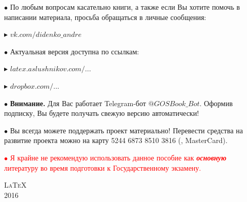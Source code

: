 \begin{flushleft}
$\bullet$ По любым вопросам касательно книги, а также если Вы хотите помочь в написании материала, просьба обращаться в личные сообщения: 

\vspace*{0.2\baselineskip}

\qquad\textcolor{Purplemountainmajesty}{$\blacktriangleright$ }\href{https://vk.com/didenko_andre}{$vk.com/didenko\_andre$}

\vfill

$\bullet$ Актуальная версия доступна по ссылкам:

\vspace*{0.2\baselineskip}

\qquad\textcolor{Purplemountainmajesty}{$\blacktriangleright$ }\href{http://latex.aslushnikov.com/compile?git=https://github.com/DidenkoAndre/GOS_book&target=_main.tex}{\large \textcolor{Purplemountainmajesty}{$latex.aslushnikov.com/...$}}

\vspace*{0.2\baselineskip}

\qquad\textcolor{Purplemountainmajesty}{$\blacktriangleright$ }\href{https://www.dropbox.com/sh/7e5mfj8q68o2ipp/AAD8XvpZhiJzFbEh_IeH305ia?dl=0&preview=GOSBook.pdf}{\large \textcolor{Purplemountainmajesty}{$dropbox.com/...$}}

\vfill

$\bullet$ \textbf{Внимание.} Для Вас работает Telegram-бот \href{https://t.me/GOSBook_Bot}{\textcolor{PersianBlue}{$@GOSBook\_Bot$}}. Оформив подписку\footnotemark{}, Вы будете получать свежую версию автоматически!


\vfill

$\bullet$ Вы всегда можете поддержать проект материально! 
Перевести средства на развитие проекта можно на карту {\large 5244 6873 8510 3816} \textsf{(\grqq, MasterCard)}.

\bigskip
\vfill

\bigskip
\vfill

\textcolor{red}{
$\bullet$ Я крайне не рекомендую использовать данное пособие как \textit{\textbf{основную}} литературу во время подготовки к Государственному экзамену.
}
\end{flushleft}

\vfill
{\LARGE\scshape \LaTeX}\\[0.5\baselineskip]
{\LARGE\scshape 2016}\par
\restoregeometry
\endgroup
\newpage